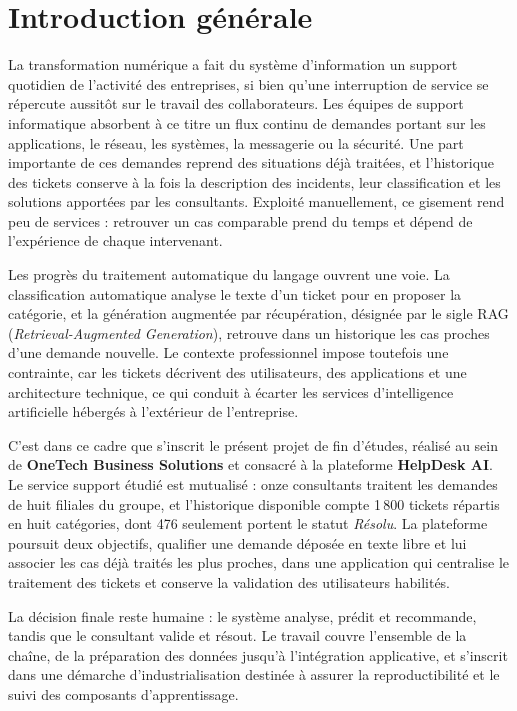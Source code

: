 \chapter*{Introduction générale}

La transformation numérique a fait du système d'information un support quotidien de l'activité des
entreprises, si bien qu'une interruption de service se répercute aussitôt sur le travail des
collaborateurs. Les équipes de support informatique absorbent à ce titre un flux continu de
demandes portant sur les applications, le réseau, les systèmes, la messagerie ou la sécurité. Une
part importante de ces demandes reprend des situations déjà traitées, et l'historique des tickets
conserve à la fois la description des incidents, leur classification et les solutions apportées par
les consultants. Exploité manuellement, ce gisement rend peu de services : retrouver un cas
comparable prend du temps et dépend de l'expérience de chaque intervenant.

Les progrès du traitement automatique du langage ouvrent une voie. La classification automatique
analyse le texte d'un ticket pour en proposer la catégorie, et la génération augmentée par
récupération, désignée par le sigle RAG (\textit{Retrieval-Augmented Generation}), retrouve dans un
historique les cas proches d'une demande nouvelle. Le contexte professionnel impose toutefois une
contrainte, car les tickets décrivent des utilisateurs, des applications et une architecture
technique, ce qui conduit à écarter les services d'intelligence artificielle hébergés à l'extérieur
de l'entreprise.

C'est dans ce cadre que s'inscrit le présent projet de fin d'études, réalisé au sein de
\textbf{OneTech Business Solutions} et consacré à la plateforme \textbf{HelpDesk AI}. Le service
support étudié est mutualisé : onze consultants traitent les demandes de huit filiales du groupe, et
l'historique disponible compte 1\,800 tickets répartis en huit catégories, dont 476 seulement
portent le statut \emph{Résolu}. La plateforme poursuit deux objectifs, qualifier une demande
déposée en texte libre et lui associer les cas déjà traités
les plus proches, dans une application qui centralise le traitement des tickets et conserve la
validation des utilisateurs habilités.

La décision finale reste humaine : le système analyse, prédit et recommande, tandis que le
consultant valide et résout. Le travail couvre l'ensemble de la chaîne, de la préparation des
données jusqu'à l'intégration applicative, et s'inscrit dans une démarche d'industrialisation
destinée à assurer la reproductibilité et le suivi des composants d'apprentissage.

